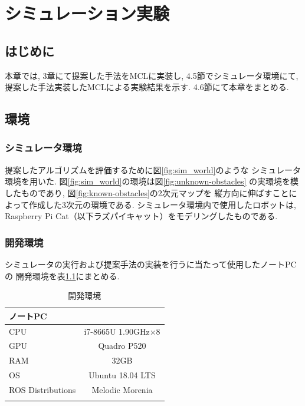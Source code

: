\chapter{シミュレーション実験}\label{chap:simulation_experiment}

\section{はじめに}
本章では, 3章にて提案した手法をMCLに実装し, 
4.5節でシミュレータ環境にて, 提案した手法実装したMCLによる実験結果を示す. 
4.6節にて本章をまとめる. 

\section{環境}

\subsection{シミュレータ環境}

提案したアルゴリズムを評価するために図\ref{fig:sim_world}のような
シミュレータ環境を用いた. 図\ref{fig:sim_world}の環境は図\ref{fig:unknown-obstacles}
の実環境を模したものであり, 図\ref{fig:known-obstacles}の2次元マップを
縦方向に伸ばすことによって作成した3次元の環境である. 
シミュレータ環境内で使用したロボットは, 
Raspberry Pi Cat（以下ラズパイキャット）\cite{raspicat}\cite{RTshop}をモデリングしたものである. 

\subsection{開発環境}
シミュレータの実行および提案手法の実装を行うに当たって使用したノートPCの
開発環境を表\ref{tabule:pc_spec_sim}にまとめる. 

\begin{table}[ht]
  \caption{開発環境}
  \label{tabule:pc_spec_sim}
  \begin{center}
    \begin{tabular}{l|c} 
      \thline
      ノートPC& \\
      \hline
      CPU & i7-8665U 1.90GHz×8 \\
      GPU & Quadro P520 \\
      RAM & 32GB  \\
      OS & Ubuntu 18.04 LTS \\
      ROS Distributions & Melodic Morenia \\ 
      \thline
    \end{tabular}
  \end{center}
\end{table}


